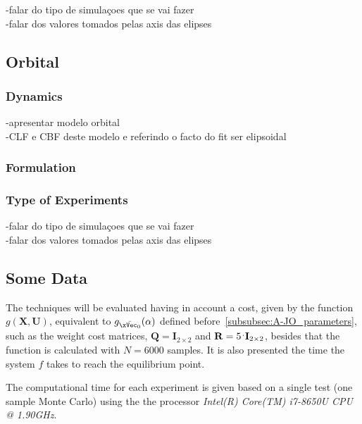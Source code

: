 -falar do tipo de simulaçoes que se vai fazer\\
-falar dos valores tomados pelas axis das elipses


\subsection{Orbital}
\label{subsec:orbital_simul_setup}

\subsubsection{Dynamics}
\label{subsubsec:orbital_dynamics}

-apresentar modelo orbital\\
-CLF e CBF deste modelo e referindo o facto do fit ser elipsoidal

\subsubsection{ Formulation}
\label{subsubsec:Orbital_CLF-CBF_Experiment_Setup}


\subsubsection{Type of Experiments}
\label{subsubsec:orbital_type_of_experiments}

-falar do tipo de simulaçoes que se vai fazer\\
-falar dos valores tomados pelas axis das elipses


\subsection{Some Data}
\label{subsec:some_data}

The techniques will be evaluated having in account a cost, given by the function \(g(\mathbf{X}, \mathbf{U})\), equivalent to \(g_{\bar{\xVec_0}}(\alpha)\) defined before~\ref{subsubsec:A-JO_parameters}, such as the weight cost matrices, \(\mathbf{Q} = \mathbf{I}_{2\times 2} \) and \(\mathbf{R} = 5 \hspace{0.1em}^.\mathbf{I}_{2\times 2} \), besides that the function is calculated with \(N=6000\) samples. It is also presented the time the system \(f\) takes to reach the equilibrium point.\par
The computational time for each experiment is given based on a single test (one sample Monte Carlo) using the the processor \emph{Intel(R) Core(TM) i7-8650U CPU @ 1.90GHz}.






